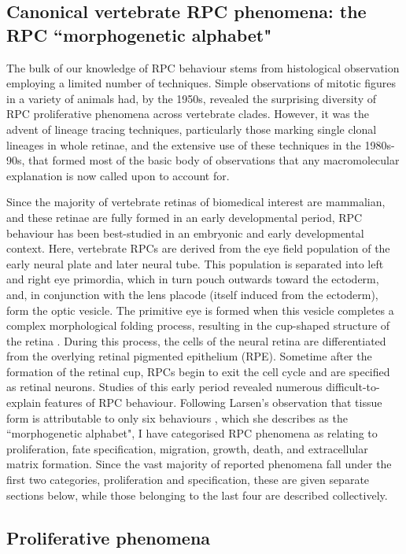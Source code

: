 \documentclass{ut-thesis}
\begin{document}
\begin{NoHyper}
\section{Canonical vertebrate RPC phenomena: the RPC ``morphogenetic alphabet"}

The bulk of our knowledge of RPC behaviour stems from histological observation employing a limited number of techniques. Simple observations of mitotic figures in a variety of animals had, by the 1950s, revealed the surprising diversity of RPC proliferative phenomena across vertebrate clades. However, it was the advent of lineage tracing techniques, particularly those marking single clonal lineages in whole retinae, and the extensive use of these techniques in the 1980s-90s, that formed most of the basic body of observations that any macromolecular explanation is now called upon to account for.

Since the majority of vertebrate retinas of biomedical interest are mammalian, and these retinae are fully formed in an early developmental period, RPC behaviour has been best-studied in an embryonic and early developmental context. Here, vertebrate RPCs are derived from the eye field population of the early neural plate and later neural tube. This population is separated into left and right eye primordia, which in turn pouch outwards toward the ectoderm, and, in conjunction with the lens placode (itself induced from the ectoderm), form the optic vesicle. The primitive eye is formed when this vesicle completes a complex morphological folding process, resulting in the cup-shaped structure of the retina \cite{Cavodeassi2018}. During this process, the cells of the neural retina are differentiated from the overlying retinal pigmented epithelium (RPE). Sometime after the formation of the retinal cup, RPCs begin to exit the cell cycle and are specified as retinal neurons. Studies of this early period revealed numerous difficult-to-explain features of RPC behaviour. Following Larsen's observation that tissue form is attributable to only six behaviours \cite{Larsen1992}, which she describes as the ``morphogenetic alphabet", I have categorised RPC phenomena as relating to proliferation, fate specification, migration, growth, death, and extracellular matrix formation. Since the vast majority of reported phenomena fall under the first two categories, proliferation and specification, these are given separate sections below, while those belonging to the last four are described collectively.

\subsection{Proliferative phenomena}


\end{NoHyper}
\end{document}
